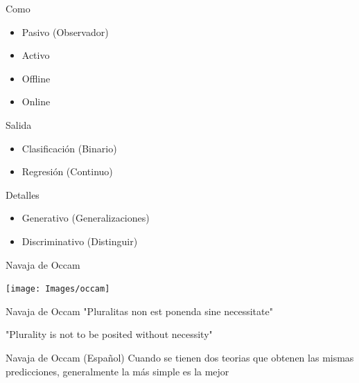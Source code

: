 \documentclass{beamer}
\begin{document}
\begin{frame}{Como}
    \begin{itemize}
        \item Pasivo (Observador)
        \item Activo
        \item Offline
        \item Online
    \end{itemize}
\end{frame}

\begin{frame}{Salida}
    \begin{itemize}
        \item Clasificación (Binario)
        \item Regresión (Continuo)
    \end{itemize}
\end{frame}

\begin{frame}{Detalles}
    \begin{itemize}
        \item Generativo (Generalizaciones)
        \item Discriminativo (Distinguir)
    \end{itemize}
\end{frame}

\begin{frame}{Navaja de Occam}
    \begin{center}
        \texttt{[image: Images/occam]}
    \end{center}
\end{frame}

\begin{frame}{Navaja de Occam}
    "Pluralitas non est ponenda sine necessitate"
    
    "Plurality is not to be posited without necessity"
\end{frame}

\begin{frame}{Navaja de Occam (Español)}
    Cuando se tienen dos teorias que obtenen las mismas predicciones, generalmente la más simple es la mejor
\end{frame}
\end{document}
